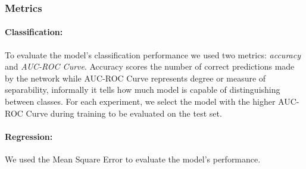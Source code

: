 \documentclass[../document.tex]{subfiles}
\begin{document}
\subsubsection{Metrics}

\paragraph{Classification:} To evaluate the model's classification performance we used two metrics: \emph{accuracy} and \emph{AUC-ROC Curve}. Accuracy scores the number of correct predictions made by the network while AUC-ROC Curve represents degree or measure of separability, informally it tells how much model is capable of distinguishing between classes. For each experiment, we select the model with the higher AUC-ROC Curve during training to be evaluated on the test set.
\paragraph{Regression:} We used the Mean Square Error to evaluate the model's performance.
\end{document}
